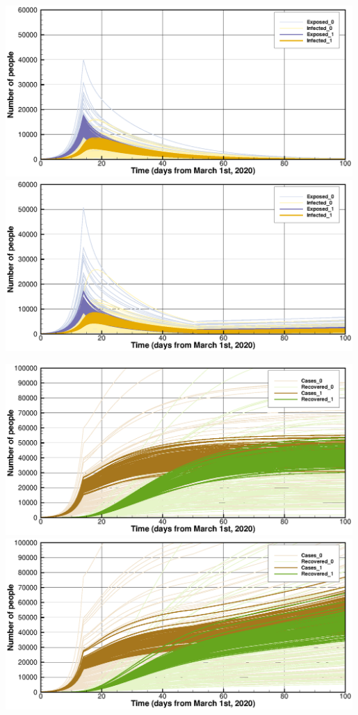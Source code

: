 \documentclass[twoside,11pt]{article}
\begin{document}
\begin{center}
\includegraphics[width=0.99\textwidth]{ClosedIE.eps} \\
\includegraphics[width=0.99\textwidth]{OpenIE.eps} 
\end{center}
\newpage
\begin{center}
\includegraphics[width=0.99\textwidth]{ClosedCR.eps} \\
\includegraphics[width=0.99\textwidth]{OpenCR.eps} 
\end{center}
\end{document}

